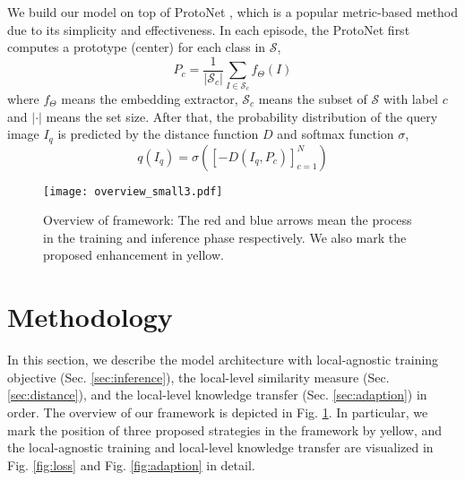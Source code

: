 \documentclass{article}
\begin{document}
We build our model on top of ProtoNet \cite{snell2017prototypical}, which is a popular metric-based method due to its simplicity and effectiveness.
In each episode, the ProtoNet first computes a prototype (center) for each class in $\mathcal S$,
\begin{equation}
    \label{eq:pro_int}
    P_c = \frac{1}{|\mathcal{S}_c|} \sum_{I \in \mathcal S_c} f_{\Theta}(I)
\end{equation}
where $f_{\Theta}$ means the embedding extractor, $\mathcal{S}_c$ means the subset of $\mathcal S$ with label $c$ and $|\cdot|$ means the set size.
After that, the probability distribution of the query image $I_q$ is predicted by the distance function $D$ and softmax function $\sigma$,
\begin{equation}
    \label{eq:pred}
    q(I_q) = \sigma([-D(I_q, P_c)]_{c=1}^N)
\end{equation}



\begin{figure}[h]
    \begin{center}
    \texttt{[image: overview\_small3.pdf]}
    \end{center}
    \vspace{-15pt}
  \caption{Overview of framework: The red and blue arrows mean the process in the training and inference phase respectively. We also mark the proposed enhancement in yellow.
    }
    \vspace{-10pt}
\label{fig:overview}
\end{figure}

\section{Methodology}
\label{approach}
In this section, we describe the model architecture with local-agnostic training objective (Sec. \ref{sec:inference}), the local-level similarity measure (Sec. \ref{sec:distance}), and the local-level knowledge transfer (Sec. \ref{sec:adaption}) in order.
The overview of our framework is depicted in Fig. \ref{fig:overview}. In particular, we mark the position of three proposed strategies in the framework by yellow, and the local-agnostic training and local-level knowledge transfer are visualized in Fig. \ref{fig:loss} and Fig. \ref{fig:adaption} in detail.
\end{document}
